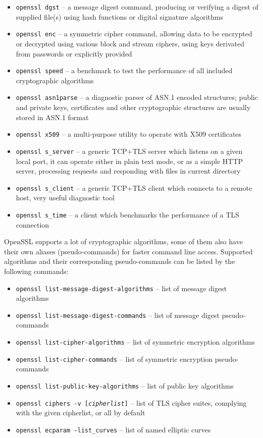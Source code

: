 \begin{itemize}
  \item \texttt{openssl dgst} -- a message digest command, producing or verifying a digest of supplied file(s) using hash functions or digital signature algorithms
  \item \texttt{openssl enc} -- a symmetric cipher command, allowing data to be encrypted or decrypted using various block and stream ciphers, using keys derivated from passwords or explicitly provided
  \item \texttt{openssl speed} -- a benchmark to test the performance of all included cryptographic algorithms
  \item \texttt{openssl asn1parse} -- a diagnostic parser of ASN.1 encoded structures; public and private keys, certificates and other cryptographic structures are usually stored in ASN.1 format
  \item \texttt{openssl x509} -- a multi-purpose utility to operate with X509 certificates
  \item \texttt{openssl s\_server} -- a generic TCP+TLS server which listens on a given local port, it can operate either in plain text mode, or as a simple HTTP server, processing requests and responding with files in current directory
  \item \texttt{openssl s\_client} -- a generic TCP+TLS client which connects to a remote host, very useful diagnostic tool
  \item \texttt{openssl s\_time} -- a client which benchmarks the performance of a TLS connection
\end{itemize}

OpenSSL supports a lot of cryptographic algorithms, some of them also have their own aliases (pseudo-commands) for faster command line access. Supported algorithms and their corresponding pseudo-commands can be listed by the following commands:

\begin{itemize}
  \item \texttt{openssl list-message-digest-algorithms} -- list of message digest algorithms
  \item \texttt{openssl list-message-digest-commands} -- list of message digest pseudo-commands
  \item \texttt{openssl list-cipher-algorithms} -- list of symmetric encryption algorithms
  \item \texttt{openssl list-cipher-commands} -- list of symmetric encryption pseudo-commands
  \item \texttt{openssl list-public-key-algorithms} -- list of public key algorithms
  \item \texttt{openssl ciphers -v [\textit{cipherlist}]} -- list of TLS cipher suites, complying with the given cipherlist, or all by default
  \item \texttt{openssl ecparam -list\_curves} -- list of named elliptic curves
\end{itemize}


